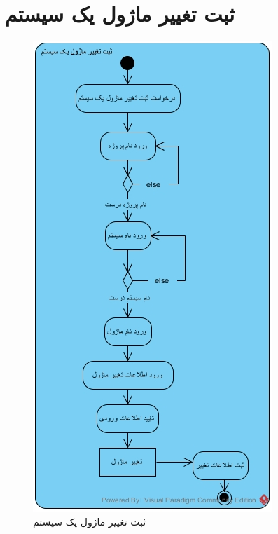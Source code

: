 \section{ثبت تغییر ماژول یک سیستم}
\begin{figure}[H]
	\centering
	\includegraphics[scale=0.8]{img/activity/submod}
	\caption{ثبت تغییر ماژول یک سیستم}
\end{figure}


